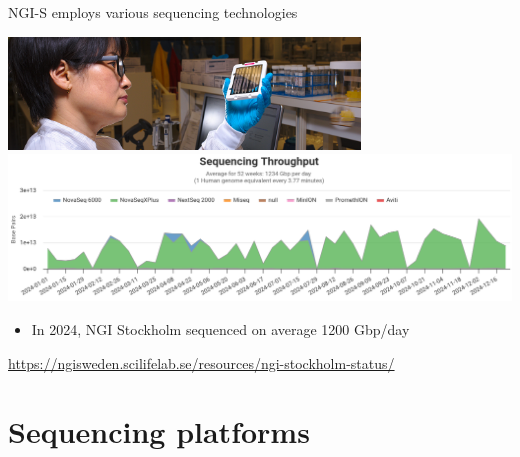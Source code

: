\documentclass[10pt]{beamer}
\newcommand{\credit}[1]{{\vspace{\fill} \par \raggedleft \scriptsize \mdseries \color{mDarkBrown} #1 \par}}
\begin{document}
\begin{frame}{NGI-S employs various sequencing technologies}
	\begin{center}
		\includegraphics[width=0.7\textwidth]{./figures/ngi-choi-flowcell.jpg} \\
		\hspace*{-1cm}
		\includegraphics[width=1.2\textwidth]{./figures/ngis-throughput-2024.png}
	\end{center}
	\begin{itemize}
		\item In 2024, NGI Stockholm sequenced on average 1200 Gbp/day
	\end{itemize}
	\credit{\href{https://ngisweden.scilifelab.se/resources/ngi-stockholm-status/}{https://ngisweden.scilifelab.se/resources/ngi-stockholm-status/}}
\end{frame}


\section{Sequencing platforms}

\end{document}
